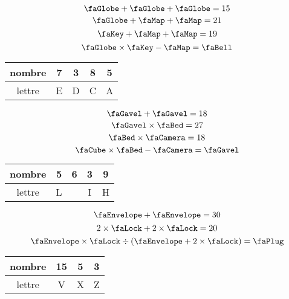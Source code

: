 \documentclass[12pt,a4paper,french,fleqn]{/home/nyaucki/Documents/Prof/CoursMaths/mycls/activite}
\begin{document}

\begin{minipage}{0.3\textwidth}
    $$\remplacea + \remplacea + \remplacea = 15$$
    $$\remplacea + \remplacec + \remplacec = 21$$
    $$\remplaced + \remplacec + \remplacec = 19$$
    $$\remplacea \times \remplaced - \remplacec=\remplacee$$

    \begin{center}
    \begin{tabular}{c*{4}{|c}}
        nombre & 7 & 3 & 8 & 5 \\\hline
        lettre & E & D & C & A    
    \end{tabular}
    \end{center}
\end{minipage}
\hfil
\vrule
\hfil
\begin{minipage}{0.3\textwidth}
    $$\remplaceh + \remplaceh = 18$$
    $$\remplaceh \times \remplacei = 27$$
    $$\remplacei \times \remplace = 18 $$
    $$\remplacel \times\remplacei - \remplace=\remplaceh$$

    \begin{center}
    \begin{tabular}{c*{4}{|c}}
        nombre & 5 & 6 & 3 & 9 \\\hline
        lettre & L &   & I & H     
    \end{tabular}
    \end{center}
\end{minipage}
\hfil
\vrule
\hfil
\begin{minipage}{0.3\textwidth}
$$\remplacev + \remplacev = 30$$
$$2\times\remplacex + 2\times\remplacex = 20$$
$$\remplacev \times \remplacex \div(\remplacev +2\times \remplacex)  =\remplacez$$

\begin{center}
\begin{tabular}{c*{3}{|c}}
    nombre & 15 & 5 & 3 \\\hline
    lettre & V & X & Z      
\end{tabular}
\end{center}
\end{minipage}
\end{document}
